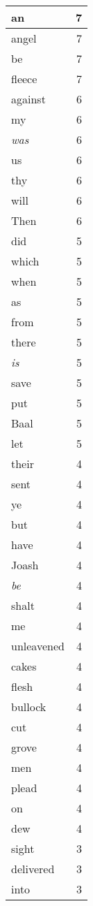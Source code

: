 \begin{center}
\begin{longtable}{l|r}
an & 7\\ \hline 
angel & 7\\ \hline 
be & 7\\ \hline 
fleece & 7\\ \hline 
against & 6\\ \hline 
my & 6\\ \hline 
\emph{was} & 6\\ \hline 
us & 6\\ \hline 
thy & 6\\ \hline 
will & 6\\ \hline 
Then & 6\\ \hline 
did & 5\\ \hline 
which & 5\\ \hline 
when & 5\\ \hline 
as & 5\\ \hline 
from & 5\\ \hline 
there & 5\\ \hline 
\emph{is} & 5\\ \hline 
save & 5\\ \hline 
put & 5\\ \hline 
Baal & 5\\ \hline 
let & 5\\ \hline 
their & 4\\ \hline 
sent & 4\\ \hline 
ye & 4\\ \hline 
but & 4\\ \hline 
have & 4\\ \hline 
Joash & 4\\ \hline 
\emph{be} & 4\\ \hline 
shalt & 4\\ \hline 
me & 4\\ \hline 
unleavened & 4\\ \hline 
cakes & 4\\ \hline 
flesh & 4\\ \hline 
bullock & 4\\ \hline 
cut & 4\\ \hline 
grove & 4\\ \hline 
men & 4\\ \hline 
plead & 4\\ \hline 
on & 4\\ \hline 
dew & 4\\ \hline 
sight & 3\\ \hline 
delivered & 3\\ \hline 
into & 3\\ \hline 

\end{longtable}
\end{center}
